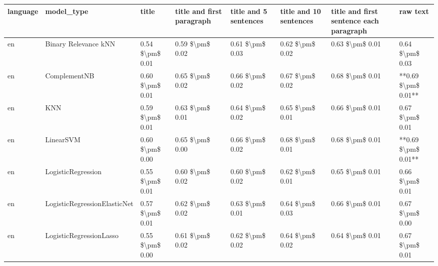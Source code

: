 \begin{tabular}{llllllll}
\toprule
language &                      model\_type &           title & title and first paragraph & title and 5 sentences & title and 10 sentences & title and first sentence each paragraph &            raw text \\
\midrule
      en &            Binary Relevance kNN & 0.54 \$\textbackslash pm\$ 0.01 &           0.59 \$\textbackslash pm\$ 0.02 &       0.61 \$\textbackslash pm\$ 0.03 &        0.62 \$\textbackslash pm\$ 0.02 &                         0.63 \$\textbackslash pm\$ 0.01 &     0.64 \$\textbackslash pm\$ 0.03 \\
      en &                    ComplementNB & 0.60 \$\textbackslash pm\$ 0.01 &           0.65 \$\textbackslash pm\$ 0.02 &       0.66 \$\textbackslash pm\$ 0.02 &        0.67 \$\textbackslash pm\$ 0.02 &                         0.68 \$\textbackslash pm\$ 0.01 & **0.69 \$\textbackslash pm\$ 0.01** \\
      en &                             KNN & 0.59 \$\textbackslash pm\$ 0.01 &           0.63 \$\textbackslash pm\$ 0.01 &       0.64 \$\textbackslash pm\$ 0.02 &        0.65 \$\textbackslash pm\$ 0.01 &                         0.66 \$\textbackslash pm\$ 0.01 &     0.67 \$\textbackslash pm\$ 0.01 \\
      en &                       LinearSVM & 0.60 \$\textbackslash pm\$ 0.00 &           0.65 \$\textbackslash pm\$ 0.00 &       0.66 \$\textbackslash pm\$ 0.02 &        0.68 \$\textbackslash pm\$ 0.01 &                         0.68 \$\textbackslash pm\$ 0.01 & **0.69 \$\textbackslash pm\$ 0.01** \\
      en &              LogisticRegression & 0.55 \$\textbackslash pm\$ 0.01 &           0.60 \$\textbackslash pm\$ 0.02 &       0.60 \$\textbackslash pm\$ 0.02 &        0.62 \$\textbackslash pm\$ 0.01 &                         0.65 \$\textbackslash pm\$ 0.01 &     0.66 \$\textbackslash pm\$ 0.01 \\
      en &    LogisticRegressionElasticNet & 0.57 \$\textbackslash pm\$ 0.01 &           0.62 \$\textbackslash pm\$ 0.02 &       0.63 \$\textbackslash pm\$ 0.01 &        0.64 \$\textbackslash pm\$ 0.03 &                         0.66 \$\textbackslash pm\$ 0.01 &     0.67 \$\textbackslash pm\$ 0.00 \\
      en &         LogisticRegressionLasso & 0.55 \$\textbackslash pm\$ 0.00 &           0.61 \$\textbackslash pm\$ 0.02 &       0.62 \$\textbackslash pm\$ 0.02 &        0.64 \$\textbackslash pm\$ 0.02 &                         0.64 \$\textbackslash pm\$ 0.01 &     0.67 \$\textbackslash pm\$ 0.01 \\

\end{tabular}
